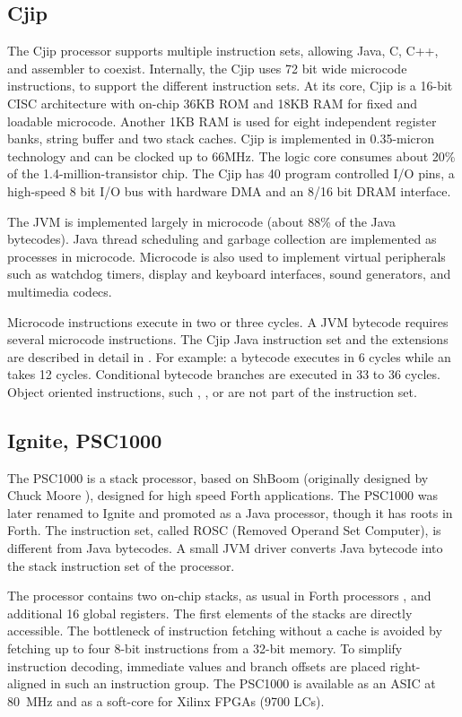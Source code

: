\subsection{Cjip}

The Cjip processor \cite{Imsys, Cjip} supports multiple instruction
sets, allowing Java, C, C++, and assembler to coexist. Internally,
the Cjip uses 72 bit wide microcode instructions, to support the
different instruction sets. At its core, Cjip is a 16-bit CISC
architecture with on-chip 36KB ROM and 18KB RAM for fixed and
loadable microcode. Another 1KB RAM is used for eight independent
register banks, string buffer and two stack caches. Cjip is
implemented in 0.35-micron technology and can be clocked up to 66MHz.
The logic core consumes about 20\% of the 1.4-million-transistor
chip. The Cjip has 40 program controlled I/O pins, a high-speed 8 bit
I/O bus with hardware DMA and an 8/16 bit DRAM interface.


The JVM is implemented largely in microcode (about 88\% of the Java
bytecodes). Java thread scheduling and garbage collection are
implemented as processes in microcode. Microcode is also used to
implement virtual peripherals such as watchdog timers, display and
keyboard interfaces, sound generators, and multimedia codecs.

Microcode instructions execute in two or three cycles. A JVM bytecode
requires several microcode instructions. The Cjip Java instruction
set and the extensions are described in detail in \cite{CjipRef}. For
example: a bytecode  executes in 6 cycles while an
 takes 12 cycles. Conditional bytecode branches are
executed in 33 to 36 cycles. Object oriented instructions, such
, , or  are not
part of the instruction set.


\subsection{Ignite, PSC1000}

The PSC1000 \cite{IGNITE} is a stack processor, based on ShBoom
(originally designed by Chuck Moore \cite{ShBoom}), designed for high
speed Forth applications. The PSC1000 was later renamed to Ignite and
promoted as a Java processor, though it has roots in Forth. The
instruction set, called ROSC (Removed Operand Set Computer), is
different from Java bytecodes. A small JVM driver converts Java
bytecode into the stack instruction set of the processor.


The processor contains two on-chip stacks, as usual in Forth
processors \cite{Koopman89}, and additional 16 global registers. The
first elements of the stacks are directly accessible. The bottleneck
of instruction fetching without a cache is avoided by fetching up to
four 8-bit instructions from a 32-bit memory. To simplify instruction
decoding, immediate values and branch offsets are placed
right-aligned in such an instruction group. The PSC1000 is available
as an ASIC at 80~MHz and as a soft-core for Xilinx FPGAs (9700 LCs).


